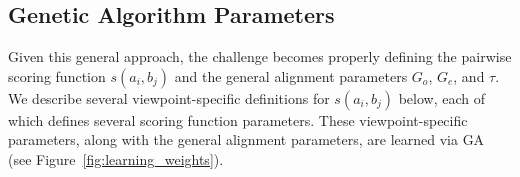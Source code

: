\documentclass[phd,electronic,oneside,twosidetoc,letterpaper,chaptercenter,parttop,lol,lof,lot]{byumsphd}
\begin{document}
\subsection{Genetic Algorithm Parameters}

Given this general approach, the challenge becomes properly defining the pairwise scoring function $s(a_i,b_j)$ and the general alignment parameters $G_o$, $G_e$, and $\tau$. We describe several viewpoint-specific definitions for $s(a_i, b_j)$ below, each of which defines several scoring function parameters. These viewpoint-specific parameters, along with the general alignment parameters, are learned via GA (see Figure~\ref{fig:learning_weights}).

\begin{figure}
\centering
\newcommand{\colwidth}{1.1in}
\setlength\tabcolsep{2pt} %
\newcolumntype{D}{ >{\centering\arraybackslash} m{\colwidth} }
\begin{tabular}{DDDDDDD}

\end{tabular}
\end{figure}
\end{document}
